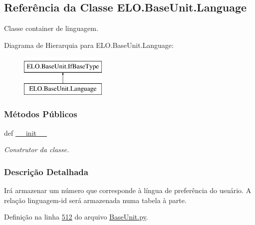 \hypertarget{classELO_1_1BaseUnit_1_1Language}{\subsection{Referência da Classe E\-L\-O.\-Base\-Unit.\-Language}
\label{classELO_1_1BaseUnit_1_1Language}
}


Classe container de linguagem.  


Diagrama de Hierarquia para E\-L\-O.\-Base\-Unit.\-Language\-:\begin{figure}[H]
\begin{center}
\leavevmode
\includegraphics[height=2.000000cm]{d2/d3e/classELO_1_1BaseUnit_1_1Language}
\end{center}
\end{figure}
\subsubsection*{Métodos Públicos}
\begin{DoxyCompactItemize}
\item 
def \hyperlink{classELO_1_1BaseUnit_1_1Language_a0b717ad014a17f87cbe20caf5be56fb8}{\-\_\-\-\_\-init\-\_\-\-\_\-}
\begin{DoxyCompactList}\small\item\em Construtor da classe. \end{DoxyCompactList}\end{DoxyCompactItemize}


\subsubsection{Descrição Detalhada}
Irá armazenar um número que corresponde à língua de preferência do usuário. A relação linguagem-\/id será armazenada numa tabela à parte. 

Definição na linha \hyperlink{BaseUnit_8py_source_l00512}{512} do arquivo \hyperlink{BaseUnit_8py_source}{Base\-Unit.\-py}.



